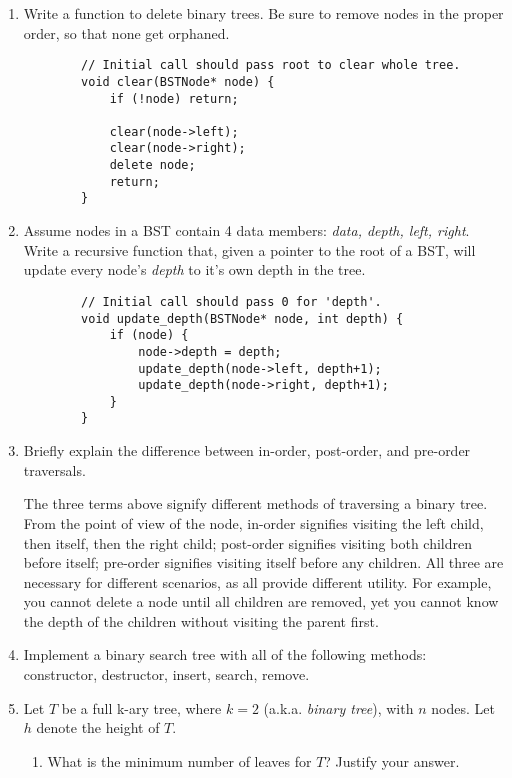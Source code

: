 \documentclass[11pt]{article}
\begin{document}
\begin{enumerate}
    \newpage
    \item Write a function to delete binary trees. Be sure to remove nodes in the proper order, so that none get orphaned.

    \begin{verbatim}
        // Initial call should pass root to clear whole tree.
        void clear(BSTNode* node) {
            if (!node) return;
            
            clear(node->left);
            clear(node->right);
            delete node;
            return;
        }
    \end{verbatim}

    \item Assume nodes in a BST contain 4 data members: {\it data, depth, left, right}.  Write a recursive function that, given a pointer to the root of a BST, will update every node's {\it depth} to it's own depth in the tree.

    \begin{verbatim}
        // Initial call should pass 0 for 'depth'.
        void update_depth(BSTNode* node, int depth) {
            if (node) {
                node->depth = depth;
                update_depth(node->left, depth+1);
                update_depth(node->right, depth+1);
            }
        }
    \end{verbatim}

    \item Briefly explain the difference between in-order, post-order, and pre-order traversals.

    The three terms above signify different methods of traversing a binary tree. From the point of view of the node, in-order signifies visiting the left child, then itself, then the right child; post-order signifies visiting both children before itself; pre-order signifies visiting itself before any children. All three are necessary for different scenarios, as all provide different utility. For example, you cannot delete a node until all children are removed, yet you cannot know the depth of the children without visiting the parent first.

    \item Implement a binary search tree with all of the following methods: constructor, destructor, insert, search, remove.

    \item Let $T$ be a full k-ary tree, where $k=2$ (a.k.a. {\it binary tree}), with $n$ nodes.  Let $h$ denote the height of $T$.
    \begin{enumerate}
        \item What is the minimum number of leaves for $T$?  Justify your answer.


\end{enumerate}
\end{enumerate}
\end{document}
